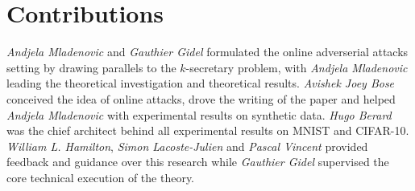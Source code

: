 \section*{Contributions}



\emph{Andjela Mladenovic} and \emph{Gauthier Gidel} formulated the online adverserial attacks setting by drawing parallels to the $k$-secretary problem, with \emph{Andjela Mladenovic} leading the theoretical investigation and theoretical results. \emph{Avishek Joey Bose} conceived the idea of online attacks, drove the writing of the paper and helped \emph{Andjela Mladenovic} with experimental results on synthetic data. \emph{Hugo Berard} was the chief architect behind all experimental results on MNIST and CIFAR-10.  \emph{William L. Hamilton}, \emph{Simon Lacoste-Julien} and \emph{Pascal Vincent} provided feedback and guidance over this research while \emph{Gauthier Gidel} supervised the core technical execution of the theory.